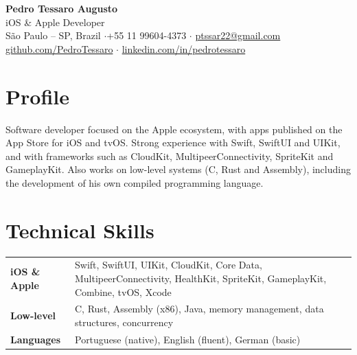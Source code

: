 \documentclass[11pt,a4paper]{article}
\begin{document}
\begin{center}
  {\Huge\bfseries Pedro Tessaro Augusto}\\[3pt]
  {\large\color{accent} iOS \& Apple Developer}\\[6pt]
  {\color{muted}\small
    São Paulo -- SP, Brazil \quad$\cdot$\quad +55 11 99604-4373 \quad$\cdot$\quad
    \href{mailto:ptssar22@gmail.com}{ptssar22@gmail.com}\\[2pt]
    \href{https://github.com/PedroTessaro}{github.com/PedroTessaro} \quad$\cdot$\quad
    \href{https://linkedin.com/in/pedrotessaro}{linkedin.com/in/pedrotessaro}
  }
\end{center}
\vspace{2pt}

\section{Profile}
Software developer focused on the Apple ecosystem, with apps published on the App Store for
iOS and tvOS. Strong experience with Swift, SwiftUI and UIKit, and with frameworks such as
CloudKit, MultipeerConnectivity, SpriteKit and GameplayKit. Also works on low-level systems
(C, Rust and Assembly), including the development of his own compiled programming language.

\section{Technical Skills}
\begin{tabularx}{\textwidth}{@{}l X@{}}
  \textbf{iOS \& Apple} & Swift, SwiftUI, UIKit, CloudKit, Core Data, MultipeerConnectivity, HealthKit, SpriteKit, GameplayKit, Combine, tvOS, Xcode \\[3pt]
  \textbf{Low-level}    & C, Rust, Assembly (x86), Java, memory management, data structures, concurrency \\[3pt]
  \textbf{Languages}    & Portuguese (native), English (fluent), German (basic) \\
\end{tabularx}

\end{document}
